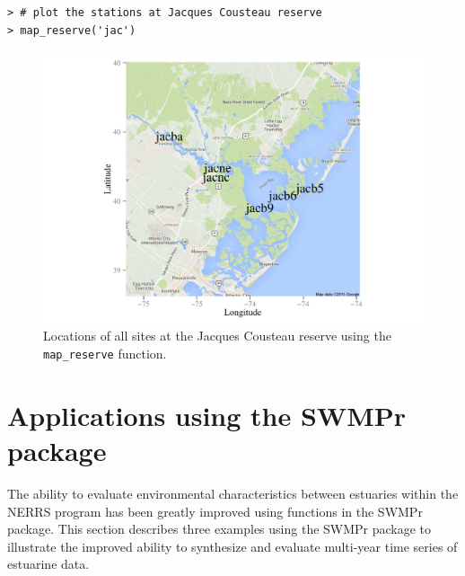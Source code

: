 \documentclass[10pt,letterpaper]{article}\usepackage[]{graphicx}\usepackage[]{color}
\makeatletter
\def\maxwidth{ %
  \ifdim\Gin@nat@width>\linewidth
    \linewidth
  \else
    \Gin@nat@width
  \fi
}
\newenvironment{kframe}{%
 \def\at@end@of@kframe{}%
 \ifinner\ifhmode%
  \def\at@end@of@kframe{\end{minipage}}%
  \begin{minipage}{\columnwidth}%
 \fi\fi%
 \def\FrameCommand##1{\hskip\@totalleftmargin \hskip-\fboxsep
 \colorbox{shadecolor}{##1}\hskip-\fboxsep
     \hskip-\linewidth \hskip-\@totalleftmargin \hskip\columnwidth}%
 \MakeFramed {\advance\hsize-\width
   \@totalleftmargin\z@ \linewidth\hsize
   \@setminipage}}%
 {\par\unskip\endMakeFramed%
 \at@end@of@kframe}
\newenvironment{knitrout}{}{} %
\makeatother
\begin{document}
\begin{knitrout}
\color{fgcolor}\begin{kframe}
\begin{verbatim}
> # plot the stations at Jacques Cousteau reserve
> map_reserve('jac')
\end{verbatim}
\end{kframe}\begin{figure}[!ht]


{\centering \includegraphics[width=\maxwidth]{figure/map_ex} 

}

\caption[Locations of all sites at the Jacques Cousteau reserve using the \texttt{map\_reserve} function]{Locations of all sites at the Jacques Cousteau reserve using the \texttt{map\_reserve} function.\label{fig:map_ex}}
\end{figure}


\end{knitrout}

\section*{Applications using the SWMPr package}
\label{swmp_apps}

The ability to evaluate environmental characteristics between estuaries within the \ac{NERRS} program has been greatly improved using functions in the SWMPr package.  This section describes three examples using the SWMPr package to illustrate the improved ability to synthesize and evaluate multi-year time series of estuarine data.  
\end{document}
